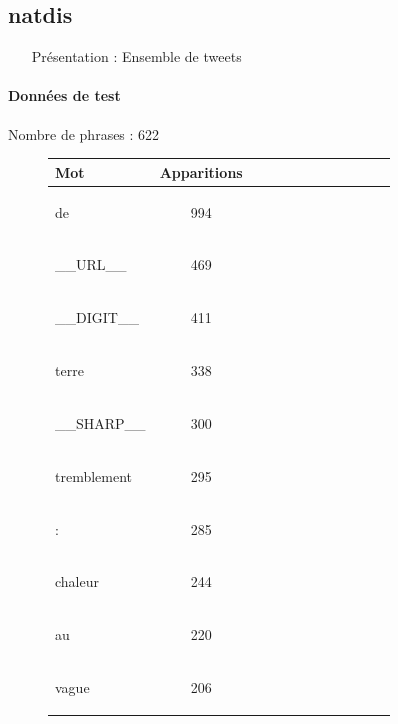 \subsection{natdis } 
 \begin{itemize} 
 \item[Présentation :] Ensemble de tweets

 \end{itemize}  \paragraph{Données de test \\ }  
 Nombre de phrases : 622\\ 
\begin{figure}[H] \begin{minipage}{0.48\textwidth} \centering \begin{tabular}{|l || *{11 }{|c} |} \hline
Mot & Apparitions  \\ \hline
\begin{verb} de \end{verb} &994\\ \hline
\begin{verb} __URL__ \end{verb} &469\\ \hline
\begin{verb} __DIGIT__ \end{verb} &411\\ \hline
\begin{verb} terre \end{verb} &338\\ \hline
\begin{verb} __SHARP__ \end{verb} &300\\ \hline
\begin{verb} tremblement \end{verb} &295\\ \hline
\begin{verb} : \end{verb} &285\\ \hline
\begin{verb} chaleur \end{verb} &244\\ \hline
\begin{verb} au \end{verb} &220\\ \hline
\begin{verb} vague \end{verb} &206\\ \hline


\end{tabular}
\end{minipage}
\end{figure}
